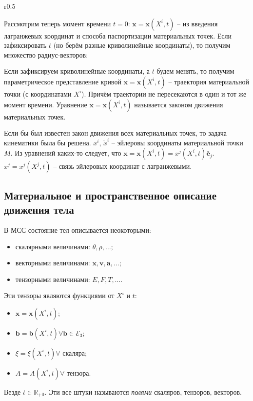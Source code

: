 \begin{wrapfigure}{r}{0.5\textwidth}
	\centering
	
\end{wrapfigure}

Рассмотрим теперь момент времени $t = 0$: $\mathbf{x} = \mathbf{x}(X^i, t)$ -- из введения лагранжевых 
координат и способа паспортизации материальных точек. Если зафиксировать $t$ (но берём разные
криволинейные координаты), то получим множество радиус-векторов:

%	

Если зафиксируем криволинейные координаты, а $t$ будем менять, то получим параметрическое
представление кривой $\mathbf{x} = \mathbf{x} ( X^i, t )$ -- траектория материальной точки (с координатами
$X^i$). Причём траектории не пересекаются в один и тот же момент времени. Уравнение $\mathbf{x} = \mathbf{x}(X^i, t)$ называется законом движения материальных точек.

Если бы был известен закон движения всех материальных точек, то задача кинематики была бы решена.
$x^{i}$, $\mathring{x}^i$ -- эйлеровы координаты материальной точки $M$. Из уравнений каких-то
следует, что $\mathbf{x} = \mathbf{x} (X^i, t) = x^j ( X^i, t) \bar{\mathbf{e}}_j$. $x^j = x^j(X^j, t)$
-- связь эйлеровых координат с лагранжевыми.

\subsection{Материальное и пространственное описание движения тела}

В МСС состояние тел описывается неокоторыми:
\begin{itemize}
  \item скалярными величинами: $\theta, \rho, \dots$;
  \item векторными величинами: $\mathbf{x}, \mathbf{v}, \mathbf{a}, \dots$;
  \item тензорными величинами: $E, F, T, \dots$.
\end{itemize}

Эти тензоры являются функциями от $X^i$ и $t$:
\begin{itemize}
  \item $\mathbf{x} = \mathbf{x} (X^i, t)$;
  \item $\mathbf{b} = \mathbf{b} (X^i, t) \forall \mathbf{b} \in \mathcal{E}_3$;
  \item $\xi = \xi(X^i, t) \forall $ скаляра;
  \item $A = A(X^i, t) \forall$ тензора.
\end{itemize}
Везде $t \in \mathbb{R}_{+0}$. Эти все штуки называются \emph{полями} скаляров, тензоров, векторов.

